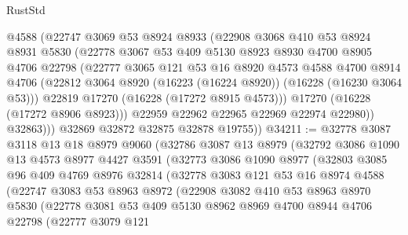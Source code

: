 \begin{lexlean}{RustStd}
\begin{coremodule}
              @4588
              (@22747
                @3069
                @53
                @8924
                @8933
                (@22908
                  @3068
                  @410
                  @53
                  @8924
                  @8931
                  @5830
                  (@22778
                    @3067
                    @53
                    @409
                    @5130
                    @8923
                    @8930
                    @4700
                    @8905
                    @4706
                    @22798
                    (@22777
                      @3065
                      @121
                      @53
                      @16
                      @8920
                      @4573
                      @4588
                      @4700
                      @8914
                      @4706
                      (@22812 @3064 @8920 (@16223 (@16224 @8920)) (@16228 (@16230 @3064 @53)))
                      @22819
                      @17270
                      (@16228 (@17272 @8915 @4573)))
                    @17270
                    (@16228 (@17272 @8906 @8923)))
                  @22959
                  @22962
                  @22965
                  @22969
                  @22974
                  @22980))
              @32863)))
        @32869
        @32872
        @32875
        @32878
        @19755))
@34211 := @32778
    @3087
    @3118
    @13
    @18
    @8979
    @9060
    (@32786
      @3087
      @13
      @8979
      (@32792
        @3086
        @1090
        @13
        @4573
        @8977
        @4427
        @3591
        (@32773
          @3086
          @1090
          @8977
          (@32803
            @3085
            @96
            @409
            @4769
            @8976
            @32814
            (@32778
              @3083
              @121
              @53
              @16
              @8974
              @4588
              (@22747
                @3083
                @53
                @8963
                @8972
                (@22908
                  @3082
                  @410
                  @53
                  @8963
                  @8970
                  @5830
                  (@22778
                    @3081
                    @53
                    @409
                    @5130
                    @8962
                    @8969
                    @4700
                    @8944
                    @4706
                    @22798
                    (@22777
                      @3079
                      @121

\end{coremodule}
\end{lexlean}
